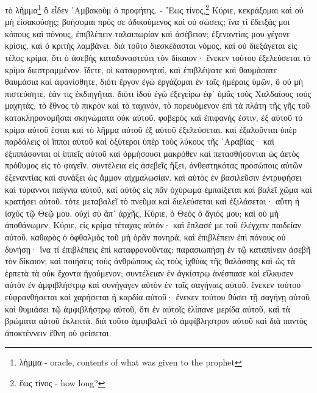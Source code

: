


τὸ
λῆμμα\footnote{λἠμμα - oracle, contents of what was given to the prophet}
ὃ
εἶδεν
᾿Αμβακοὺμ
ὁ
προφήτης. -
῞Εως
τίνος,\footnote{ἕως τίνος - how long?}
Κύριε,
κεκράξομαι
καὶ
οὐ
μὴ
εἰσακούσῃς;
βοήσομαι
πρός
σε
ἀδικούμενος
καὶ
οὐ
σώσεις;
ἵνα
τί
ἔδειξάς
μοι
κόπους
καὶ
πόνους,
ἐπιβλέπειν
ταλαιπωρίαν
καὶ
ἀσέβειαν;
ἐξεναντίας
μου
γέγονε
κρίσις,
καὶ
ὁ
κριτὴς
λαμβάνει.
διὰ
τοῦτο
διεσκέδασται
νόμος,
καὶ
οὐ
διεξάγεται
εἰς
τέλος
κρίμα,
ὅτι
ὁ
ἀσεβὴς
καταδυναστεύει
τὸν
δίκαιον·
ἕνεκεν
τούτου
ἐξελεύσεται
τὸ
κρίμα
διεστραμμένον.
ἴδετε,
οἱ
καταφρονηταί,
καὶ
ἐπιβλέψατε
καὶ
θαυμάσατε
θαυμάσια
καὶ
ἀφανίσθητε,
διότι
ἔργον
ἐγὼ
ἐργάζομαι
ἐν
ταῖς
ἡμέραις
ὑμῶν,
ὃ
οὐ
μὴ
πιστεύσητε,
ἐάν
τις
ἐκδιηγῆται.
διότι
ἰδοὺ
ἐγὼ
ἐξεγείρω
ἐφ᾿
ὑμᾶς
τοὺς
Χαλδαίους
τοὺς
μαχητάς,
τὸ
ἔθνος
τὸ
πικρὸν
καὶ
τὸ
ταχινόν,
τὸ
πορευόμενον
ἐπὶ
τὰ
πλάτη
τῆς
γῆς
τοῦ
κατακληρονομῆσαι
σκηνώματα
οὐκ
αὐτοῦ.
φοβερὸς
καὶ
ἐπιφανής
ἐστιν,
ἐξ
αὐτοῦ
τὸ
κρίμα
αὐτοῦ
ἔσται
καὶ
τὸ
λῆμμα
αὐτοῦ
ἐξ
αὐτοῦ
ἐξελεύσεται.
καὶ
ἐξαλοῦνται
ὑπὲρ
παρδάλεις
οἱ
ἵπποι
αὐτοῦ
καὶ
ὀξύτεροι
ὑπὲρ
τοὺς
λύκους
τῆς
᾿Αραβίας·
καὶ
ἐξιππάσονται
οἱ
ἱππεῖς
αὐτοῦ
καὶ
ὁρμήσουσι
μακρόθεν
καὶ
πετασθήσονται
ὡς
ἀετὸς
πρόθυμος
εἰς
τὸ
φαγεῖν.
συντέλεια
εἰς
ἀσεβεῖς
ἥξει,
ἀνθεστηκότας
προσώποις
αὐτῶν
ἐξεναντίας
καὶ
συνάξει
ὡς
ἄμμον
αἰχμαλωσίαν.
καὶ
αὐτὸς
ἐν
βασιλεῦσιν
ἐντρυφήσει
καὶ
τύραννοι
παίγνια
αὐτοῦ,
καὶ
αὐτὸς
εἰς
πᾶν
ὀχύρωμα
ἐμπαίξεται
καὶ
βαλεῖ
χῶμα
καὶ
κρατήσει
αὐτοῦ.
τότε
μεταβαλεῖ
τὸ
πνεῦμα
καὶ
διελεύσεται
καὶ
ἐξιλάσεται·
αὕτη
ἡ
ἰσχὺς
τῷ
Θεῷ
μου.
οὐχὶ
σὺ
ἀπ᾿
ἀρχῆς,
Κύριε,
ὁ
Θεὸς
ὁ
ἅγιός
μου;
καὶ
οὐ
μὴ
ἀποθάνωμεν.
Κύριε,
εἰς
κρίμα
τέταχας
αὐτόν·
καὶ
ἔπλασέ
με
τοῦ
ἐλέγχειν
παιδείαν
αὐτοῦ.
καθαρὸς
ὁ
ὀφθαλμὸς
τοῦ
μὴ
ὁρᾶν
πονηρά,
καὶ
ἐπιβλέπειν
ἐπὶ
πόνους
οὐ
δυνήσῃ·
ἵνα
τί
ἐπιβλέπεις
ἐπὶ
καταφρονοῦντας;
παρασιωπήσῃ
ἐν
τῷ
καταπίνειν
ἀσεβῆ
τὸν
δίκαιον;
καὶ
ποιήσεις
τοὺς
ἀνθρώπους
ὡς
τοὺς
ἰχθύας
τῆς
θαλάσσης
καὶ
ὡς
τὰ
ἑρπετὰ
τὰ
οὐκ
ἔχοντα
ἡγούμενον;
συντέλειαν
ἐν
ἀγκίστρῳ
ἀνέσπασε
καὶ
εἵλκυσεν
αὐτὸν
ἐν
ἀμφιβλήστρῳ
καὶ
συνήγαγεν
αὐτὸν
ἐν
ταῖς
σαγήναις
αὐτοῦ.
ἕνεκεν
τούτου
εὐφρανθήσεται
καὶ
χαρήσεται
ἡ
καρδία
αὐτοῦ·
ἕνεκεν
τούτου
θύσει
τῇ
σαγήνῃ
αὐτοῦ
καὶ
θυμιάσει
τῷ
ἀμφιβλήστρῳ
αὐτοῦ,
ὅτι
ἐν
αὐτοῖς
ἐλίπανε
μερίδα
αὐτοῦ,
καὶ
τὰ
βρώματα
αὐτοῦ
ἐκλεκτά.
διὰ
τοῦτο
ἀμφιβαλεῖ
τὸ
ἀμφίβληστρον
αὐτοῦ
καὶ
διὰ
παντὸς
ἀποκτέννειν
ἔθνη
οὐ
φείσεται.

